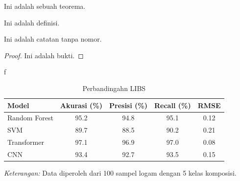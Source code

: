 \begin{theorem}
Ini adalah sebuah teorema.
\end{theorem}

\begin{definition}
Ini adalah definisi.
\end{definition}

\begin{remark}
Ini adalah catatan tanpa nomor.
\end{remark} 

\begin{proof}
Ini adalah bukti.
\end{proof}
 \begin{example}
        f
 \end{example}


 \begin{table}[H]
    \centering
    \caption{Perbandingahn  LIBS}
    \label{tab:performa_ml}
    \centering
    \begin{tabular}{lcccc}
      \toprule
      Model & Akurasi (\%) & Presisi (\%) & Recall (\%) & RMSE \\
      \midrule
      Random Forest & 95.2 & 94.8 & 95.1 & 0.12 \\
      SVM & 89.7 & 88.5 & 90.2 & 0.21 \\
      Transformer & 97.1 & 96.9 & 97.0 & 0.08 \\
      \midrule
      CNN & 93.4 & 92.7 & 93.5 & 0.15 \\
      \bottomrule
    \end{tabular}
    
    \smallskip
    \footnotesize
    \textit{Keterangan:} Data diperoleh dari 100 sampel logam dengan 5 kelas komposisi.
  \end{table}

%
